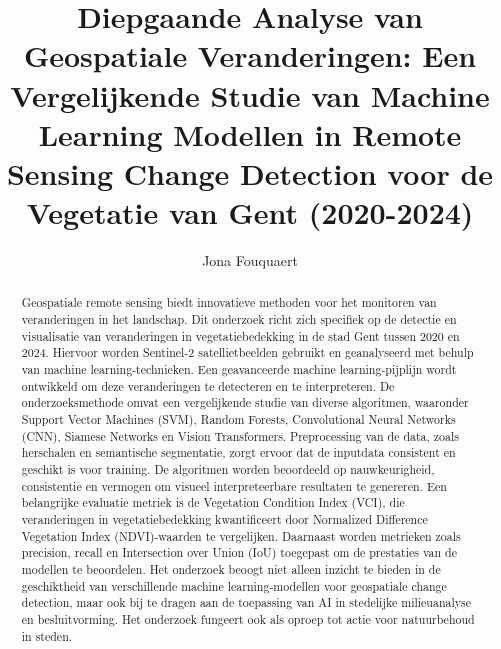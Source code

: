 \documentclass{hogent-article}
\title{Diepgaande Analyse van Geospatiale Veranderingen: Een Vergelijkende Studie van Machine Learning Modellen in Remote Sensing Change Detection voor de Vegetatie van Gent (2020-2024)}
\author{Jona Fouquaert}
\begin{document}
\begin{abstract}


Geospatiale remote sensing biedt innovatieve methoden voor het monitoren van veranderingen in het landschap. 
Dit onderzoek richt zich specifiek op de detectie en visualisatie van veranderingen in vegetatiebedekking in de stad Gent tussen 2020 en 2024.
Hiervoor worden Sentinel-2 satellietbeelden gebruikt en geanalyseerd met behulp van machine learning-technieken. 
Een geavanceerde machine learning-pijplijn wordt ontwikkeld om deze veranderingen te detecteren en te interpreteren.
De onderzoeksmethode omvat een vergelijkende studie van diverse algoritmen, waaronder Support Vector Machines (SVM), Random Forests, 
Convolutional Neural Networks (CNN), Siamese Networks en Vision Transformers. Preprocessing van de data, 
zoals herschalen en semantische segmentatie, zorgt ervoor dat de inputdata consistent en geschikt is voor training. 
De algoritmen worden beoordeeld op nauwkeurigheid, consistentie en vermogen om visueel interpreteerbare resultaten te genereren.
Een belangrijke evaluatie metriek is de Vegetation Condition Index (VCI), die veranderingen in vegetatiebedekking kwantificeert door 
Normalized Difference Vegetation Index (NDVI)-waarden te vergelijken. Daarnaast worden metrieken zoals precision, recall en 
Intersection over Union (IoU) toegepast om de prestaties van de modellen te beoordelen. Het onderzoek beoogt niet alleen inzicht te bieden 
in de geschiktheid van verschillende machine learning-modellen voor geospatiale change detection, maar ook bij te dragen aan de 
toepassing van AI in stedelijke milieuanalyse en besluitvorming. Het onderzoek fungeert ook als oproep tot actie voor natuurbehoud in steden.


\end{abstract}
\end{document}
